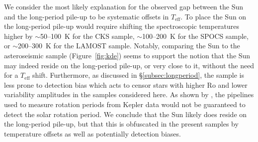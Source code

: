 \documentclass[linenumbers,tighten,trackchanges,twocolumn]{aastex631}
\newcommand{\lamostmcq}{LAMOST--McQuillan\xspace}
\newcommand{\teff}{\ensuremath{T_{\mathrm{eff}}}\xspace}
\begin{document}
{We consider the most likely explanation for the observed gap between the Sun and the long-period pile-up to be systematic offsets in \teff. To place the Sun on the long-period pile-up would require shifting the spectroscopic temperatures higher by $\sim$50--100~K for the CKS sample, $\sim$100--200~K for the SPOCS sample, or $\sim$200--300~K for the LAMOST sample. Notably, comparing the Sun to the \citet{Hall2021} asteroseismic sample (Figure~\ref{fig:kde}) seems to support the notion that the Sun may indeed reside on the long-period pile-up, or very close to it, without the need for a \teff shift. Furthermore, as discussed in \S\ref{subsec:longperiod}, the \citet{Hall2021} sample is less prone to detection bias which acts to censor stars with higher Ro and lower variability amplitudes in the samples considered here. As shown by \citet{Aigrain2015}, the pipelines used to measure rotation periods from Kepler data would not be guaranteed to detect the solar rotation period. We conclude that the Sun likely does reside on the long-period pile-up, but that this is obfuscated in the present samples by temperature offsets as well as potentially detection biases.
}


\end{document}
